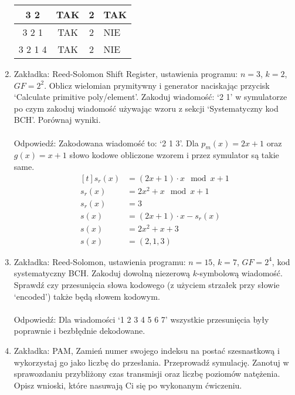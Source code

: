 \begin{enumerate}
\begin{table}[H]
\begin{tabular}{|c|c|c|>{\centering\arraybackslash}p{5cm}|}
            3 2 & TAK & 2 & TAK \\
            \hline
            3 2 1 & TAK & 2 & NIE \\
            \hline
            3 2 1 4 & TAK & 2 & NIE \\
            \hline
        \end{tabular}
    \end{table}
    \item Zakładka: Reed-Solomon Shift Register, ustawienia programu:
    $n = 3$, $k = 2$, $GF = 2^2$. Oblicz wielomian prymitywny i generator naciskając
    przycisk `Calculate primitive poly/element'.
    Zakoduj wiadomość: `2 1' w symulatorze po czym zakoduj wiadomość
    używając wzoru z sekcji `Systematyczny kod BCH'. Porównaj wyniki.
    \\ \\
    Odpowiedź: Zakodowana wiadomość to: `2 1 3'. Dla $p_m(x) = 2x + 1$ oraz $g(x) = x + 1$ słowo kodowe
    obliczone wzorem i przez symulator są takie same.
    \begin{equation*}
        \begin{aligned}[t]
            s_r(x) &= (2x+1) \cdot x \mod x + 1 \\
            s_r(x) &= 2x^2 + x \mod x + 1 \\
            s_r(x) &= 3 \\
            s(x) &= (2x+1) \cdot x - s_r(x) \\
            s(x) &= 2x^2 + x + 3 \\
            s(x) &= (2,1,3)
        \end{aligned}
    \end{equation*}
    \item Zakładka: Reed-Solomon, ustawienia programu: $n = 15$, $k=7$, $GF = 2^4$,
    kod systematyczny BCH.
    Zakoduj dowolną niezerową $k$-symbolową wiadomość. Sprawdź czy przesunięcia słowa kodowego
    (z użyciem strzałek przy słowie `encoded') także będą słowem kodowym. \\ \\
    Odpowiedź: Dla wiadomości `1 2 3 4 5 6 7' wszystkie przesunięcia były poprawnie i bezbłędnie dekodowane.
    \item Zakładka: PAM, Zamień numer swojego indeksu na postać szesnastkową i wykorzystaj go jako liczbę do przesłania. Przeprowadź symulację. Zanotuj w sprawozdaniu
    przybliżony czas transmisji oraz liczbę poziomów natężenia. Opisz wnioski, które nasuwają Ci się po wykonanym ćwiczeniu. \\ \\

\end{enumerate}

